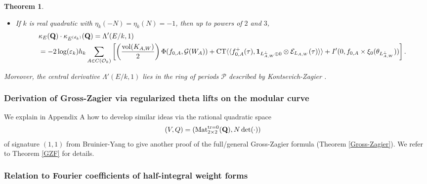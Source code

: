 \documentclass{amsart}
\newtheorem{theorem}{Theorem}[section]
\theoremstyle{definition}
\theoremstyle{definition}
\theoremstyle{definition}
\begin{document}
\begin{theorem}
\begin{itemize}
\item[(ii)] If $k$ is real quadratic with $\eta_k(-N) = \eta_k(N) = -1$, then up to powers of $2$ and $3$,
\begin{align*} &\kappa_E({\bf{Q}}) \cdot \kappa_{E^{(d_k)}}({\bf{Q}}) = \Lambda'(E/k, 1) \\
&=-2 \log(\varepsilon_k) h_k \sum\limits_{A \in C(\mathcal{O}_k)} 
\left[ \left( \frac{ \operatorname{vol}(K_{A,W}) }{2 } \right) \Phi(f_{0, A}, \mathcal{G}(W_A)) 
+ \operatorname{CT} \langle \langle f_{0, A}^+(\tau), {\bf{1}}_{L_{A, W}^{\perp} \oplus 0} \otimes \mathcal{E}_{L_{A, W}}(\tau) \rangle \rangle
+ I'(0, f_{0,A} \times \xi_0(\theta_{L_{A,W}^{\perp}})) \right]. \end{align*}

\end{itemize} Moreover, the central derivative $\Lambda'(E/k, 1)$ lies in the ring of periods $\mathcal{P}$ described by Kontsevich-Zagier \cite{KZ}.

\end{theorem}

\subsubsection{Derivation of Gross-Zagier via regularized theta lifts on the modular curve}

We explain in Appendix A how to develop similar ideas via the rational quadratic space
\begin{align}\label{(1,2)} (V, Q) &= (\operatorname{Mat}_{2 \times 2}^{\operatorname{tr}=0}({\bf{Q}}), N \det(\cdot)) \end{align}
of signature $(1,1)$ from Bruinier-Yang \cite[Theorem 1.5, Theorem 7.7, $\S$ 7]{BY} to give another proof of the full/general
Gross-Zagier formula (Theorem \ref{Gross-Zagier}). We refer to Theorem \ref{GZF} for details. 

\subsubsection{Relation to Fourier coefficients of half-integral weight forms}
\end{document}
